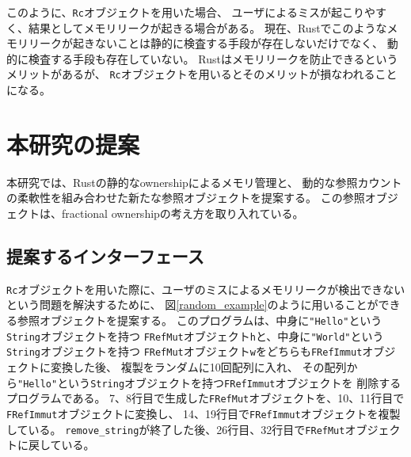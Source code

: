 \documentclass{sumiilab-paper}
\theoremstyle{mystyle}
\numberwithin{definition}{chapter} %
\begin{document}
このように、\texttt{Rc}オブジェクトを用いた場合、
ユーザによるミスが起こりやすく、結果としてメモリリークが起きる場合がある。
現在、Rustでこのようなメモリリークが起きないことは静的に検査する手段が存在しないだけでなく、
動的に検査する手段も存在していない。
Rustはメモリリークを防止できるというメリットがあるが、
\texttt{Rc}オブジェクトを用いるとそのメリットが損なわれることになる。

\chapter{本研究の提案}
本研究では、Rustの静的なownershipによるメモリ管理と、
動的な参照カウントの柔軟性を組み合わせた新たな参照オブジェクトを提案する。
この参照オブジェクトは、fractional ownershipの考え方を取り入れている。

\section{提案するインターフェース}
\texttt{Rc}オブジェクトを用いた際に、ユーザのミスによるメモリリークが検出できない
という問題を解決するために、
図\ref{random_example}のように用いることができる参照オブジェクトを提案する。
このプログラムは、中身に\texttt{"Hello"}という\texttt{String}オブジェクトを持つ
\texttt{FRefMut}オブジェクト\texttt{h}と、中身に\texttt{"World"}という\texttt{String}オブジェクトを持つ
\texttt{FRefMut}オブジェクト\texttt{w}をどちらも\texttt{FRefImmut}オブジェクトに変換した後、
複製をランダムに10回配列に入れ、
その配列から\texttt{"Hello"}という\texttt{String}オブジェクトを持つ\texttt{FRefImmut}オブジェクトを
削除するプログラムである。
7、8行目で生成した\texttt{FRefMut}オブジェクトを、10、11行目で\texttt{FRefImmut}オブジェクトに変換し、
14、19行目で\texttt{FRefImmut}オブジェクトを複製している。
\texttt{remove\_string}が終了した後、26行目、32行目で\texttt{FRefMut}オブジェクトに戻している。
\end{document}
